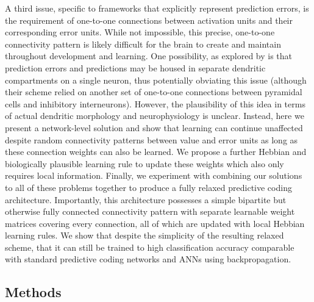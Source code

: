A third issue, specific to frameworks that explicitly represent prediction errors, is the requirement of one-to-one connections between activation units and their corresponding error units. While not impossible, this precise, one-to-one connectivity pattern is likely difficult for the brain to create and maintain throughout development and learning. One possibility, as explored by \citet{sacramento2018dendritic} is that prediction errors and predictions may be housed in separate dendritic compartments on a single neuron, thus potentially obviating this issue (although their scheme relied on another set of one-to-one connections between pyramidal cells and inhibitory interneurons). However, the plausibility of this idea in terms of actual dendritic morphology and neurophysiology is unclear. Instead, here we present a network-level solution and show that learning can continue unaffected despite random connectivity patterns between value and error units as long as these connection weights can also be learned. We propose a further Hebbian and biologically plausible learning rule to update these weights which also only requires local information. Finally, we experiment with combining our solutions to all of these problems together to produce a fully relaxed predictive coding architecture. Importantly, this architecture possesses a simple bipartite but otherwise fully connected connectivity pattern with separate learnable weight matrices covering every connection, all of which are updated with local Hebbian learning rules. We show that despite the simplicity of the resulting relaxed scheme, that it can still be trained to high classification accuracy comparable with standard predictive coding networks and ANNs using backpropagation.

\subsection{Methods}

